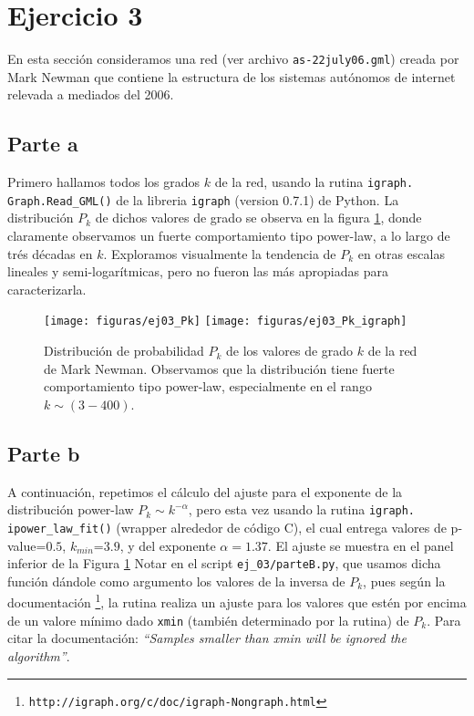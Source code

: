 \section{Ejercicio 3}

En esta secci\'on consideramos una red (ver archivo \texttt{as-22july06.gml}) creada por Mark Newman que contiene la estructura de los sistemas aut\'onomos de internet relevada a mediados del 2006.


\subsection{Parte a}
\def \ScriptA {\texttt{ej\_03/parteA.py}}

Primero hallamos todos los grados $k$ de la red, usando la rutina \texttt{igraph.\\
Graph.Read\_GML()} de la libreria \texttt{igraph} (version 0.7.1) de Python.
La distribuci\'on $P_k$ de dichos valores de grado se observa en la figura \ref{fig:ej03_1}, donde claramente observamos un fuerte comportamiento tipo power-law, a lo largo de tr\'es d\'ecadas en $k$.
Exploramos visualmente la tendencia de $P_k$ en otras escalas lineales y semi-logar\'itmicas, pero no fueron las m\'as apropiadas para caracterizarla.


\begin{figure}
\centering
\texttt{[image: figuras/ej03\_Pk]}
\texttt{[image: figuras/ej03\_Pk\_igraph]}
\caption{Distribuci\'on de probabilidad $P_k$ de los valores de grado $k$ de la red de Mark Newman.
Observamos que la distribuci\'on tiene fuerte comportamiento tipo power-law, especialmente en el rango $k \sim (3-400)$.}
\label{fig:ej03_1}
\end{figure}



\subsection{Parte b}
\def \ScriptB {\texttt{ej\_03/parteB.py}}

A continuaci\'on, repetimos el c\'alculo del ajuste para el exponente de la distribuci\'on power-law $P_k \sim k^{-\alpha}$, pero esta vez usando la rutina \texttt{igraph.\\
ipower\_law\_fit()} (wrapper alrededor de c\'odigo C), el cual entrega valores de p-value=$0.5$, $k_{min}$=$3.9$, y del exponente $\alpha=1.37$.
El ajuste se muestra en el panel inferior de la Figura \ref{fig:ej03_1}
Notar en el script \ScriptB, que usamos dicha funci\'on d\'andole como argumento los valores de la inversa de $P_k$, pues seg\'un la documentaci\'on 
\footnote{\texttt{http://igraph.org/c/doc/igraph-Nongraph.html}}, 
la rutina realiza un ajuste para los valores que est\'en por encima de un valore m\'inimo dado \texttt{xmin} (tambi\'en determinado por la rutina) de $P_k$. 
Para citar la documentaci\'on: \textit{``Samples smaller than xmin will be ignored the algorithm''}.



